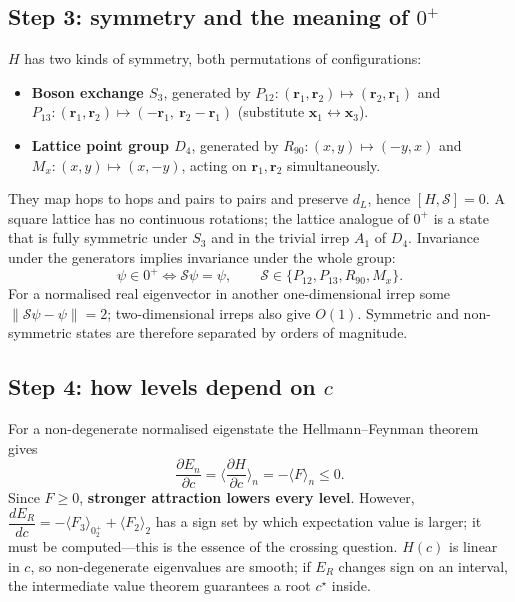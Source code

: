 \documentclass[11pt,a4paper]{article}
\newcommand{\rr}{\mathbf r}
\begin{document}
\subsection{Step 3: symmetry and the meaning of $0^+$}
$H$ has two kinds of symmetry, both permutations of configurations:
\begin{itemize}
\item \textbf{Boson exchange $S_3$}, generated by $P_{12}:(\rr_1,\rr_2)\mapsto(\rr_2,\rr_1)$ and
      $P_{13}:(\rr_1,\rr_2)\mapsto(-\rr_1,\ \rr_2-\rr_1)$ (substitute $\mathbf x_1\leftrightarrow\mathbf x_3$).
\item \textbf{Lattice point group $D_4$}, generated by $R_{90}:(x,y)\mapsto(-y,x)$ and $M_x:(x,y)\mapsto(x,-y)$, acting on $\rr_1,\rr_2$ simultaneously.
\end{itemize}
They map hops to hops and pairs to pairs and preserve $d_L$, hence $[H,\mathcal S]=0$.
A square lattice has no continuous rotations; the lattice analogue of $0^+$ is a state that is fully symmetric under $S_3$ and in the trivial irrep $A_1$ of $D_4$.
Invariance under the generators implies invariance under the whole group:
\begin{equation}
\psi\in0^+\iff \mathcal S\psi=\psi,\qquad \mathcal S\in\{P_{12},P_{13},R_{90},M_x\}.
\end{equation}
For a normalised real eigenvector in another one-dimensional irrep some $\|\mathcal S\psi-\psi\|=2$; two-dimensional irreps also give $O(1)$.
Symmetric and non-symmetric states are therefore separated by orders of magnitude.

\subsection{Step 4: how levels depend on $c$}
For a non-degenerate normalised eigenstate the Hellmann--Feynman theorem gives
\begin{equation}
\frac{\partial E_n}{\partial c}=\Big\langle\frac{\partial H}{\partial c}\Big\rangle_n=-\langle F\rangle_n\le0 .
\end{equation}
Since $F\ge0$, \textbf{stronger attraction lowers every level}. However,
$\dfrac{dE_R}{dc}=-\langle F_3\rangle_{0^+_2}+\langle F_2\rangle_{2}$ has a sign set by which expectation value is larger; it must be computed---this is the essence of the crossing question.
$H(c)$ is linear in $c$, so non-degenerate eigenvalues are smooth; if $E_R$ changes sign on an interval, the intermediate value theorem guarantees a root $c^\star$ inside.
\end{document}
